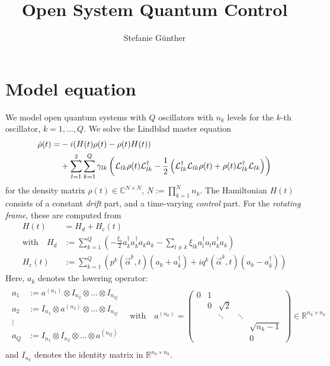 \documentclass[letterpaper]{article}
\title{Open System Quantum Control}
\author{Stefanie G{\"u}nther}
\newcommand{\Ell}{\mathcal{L}}
\newcommand{\R}{\mathds{R}}
\newcommand{\C}{\mathds{C}}
\begin{document}
\maketitle

\section{Model equation}
We model open quantum systems with $Q$ oscillators with $n_k$ levels for the $k$-th oscillator, $k=1,\dots,Q$. We solve the Lindblad master equation
\begin{align}\label{mastereq}
  \dot \rho(t) = &-i(H(t)\rho(t) - \rho(t)H(t)) \notag \\
          &+ \sum_{l=1}^2 \sum_{k=1}^Q \gamma_{lk} \left( \Ell_{lk} \rho(t) \Ell_{lk}^{\dagger} - \frac 1 2 \left( \Ell_{lk}^{\dagger}\Ell_{lk} \rho(t) + \rho(t)\Ell_{lk}^{\dagger} \Ell_{lk}\right) \right)
\end{align}
for the density matrix $\rho(t)\in \C^{N\times N}$, $N := \prod_{k=1}^N n_k$. The Hamiltonian $H(t)$ consists of a constant \textit{drift} part, and a time-varying \textit{control} part. For the \textit{rotating frame}, these are computed from
\begin{align}
  H(t) &= H_d + H_c(t) \\
  \text{with} \quad H_d &:= \sum_{k=1}^Q \left(- \frac{\xi_k}{2} a_k^{\dagger}a_k^{\dagger}a_k a_k - \sum_{l\neq k} \xi_{lk} a_l^{\dagger}a_l a_k^{\dagger} a_k  \right) \\
                 H_c(t) &:= \sum_{k=1}^Q \left( p^k(\vec{\alpha}^k,t) (a_k + a_k^{\dagger}) + i q^k(\vec{\alpha}^k,t)(a_k - a_k^{\dagger})  \right)
\end{align}
Here, $a_k$ denotes the lowering operator:
\begin{align}
  \begin{array}{rl}
  a_1 &:= a^{(n_1)} \otimes I_{n_2} \otimes \dots \otimes I_{n_Q}\\
  a_2 &:= I_{n_1} \otimes a^{(n_2)} \otimes \dots \otimes I_{n_Q}\\
  \vdots \, & \\
  a_Q &:= I_{n_1} \otimes I_{n_2} \otimes \dots \otimes a^{(n_Q)}\\
  \end{array}
  \quad \text{with}\quad
 a^{(n_k)} = \begin{pmatrix}
   0 & 1 &          &         &    \\
     & 0 & \sqrt{2} &         &     \\
     &   & \ddots   & \ddots  &    \\
     &   &          &         & \sqrt{n_k-1}  \\
     &   &          &         & 0   
 \end{pmatrix} \in \R^{n_k \times n_k}
\end{align}
and $I_{n_k}$ denotes the identity matrix in $\R^{n_k \times n_k}$.
\end{document}
